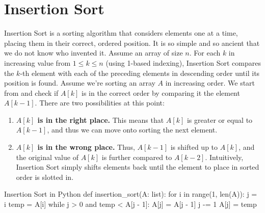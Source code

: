 \section{Insertion Sort}

Insertion Sort is a sorting algorithm that considers elements one at a
time, placing them in their correct, ordered position. It is so simple
and so ancient that we do not know who invented it. Assume an array of
size $n$. For each $k$ in increasing value from $1 \le k \le n$ (using
1-based indexing), Insertion Sort compares the $k$-th element with each
of the preceding elements in descending order until its position is
found. Assume we're sorting an array $A$ in increasing order. We start from
and check if $A[k]$ is in the correct order by comparing it
the element $A[k - 1]$. There are two possibilities at this point:

\begin{enumerate}
  \item \textbf{$A[k]$ is in the right place.} This means that $A[k]$ is
    greater or equal to $A[k - 1]$, and thus we can move onto sorting
    the next element.
  \item \textbf{$A[k]$ is in the wrong place.} Thus, $A[k - 1]$ is
    shifted up to $A[k]$, and the original value of $A[k]$ is further
    compared to $A[k - 2]$. Intuitively, Insertion Sort simply shifts
    elements back until the element to place in sorted order is slotted
    in.
\end{enumerate}

\begin{pylisting}{Insertion Sort in Python}
def insertion_sort(A: list):
    for i in range(1, len(A)):
        j = i
        temp = A[i]
        while j > 0 and temp < A[j - 1]:
            A[j] = A[j - 1]
            j -= 1
        A[j] = temp
\end{pylisting}

